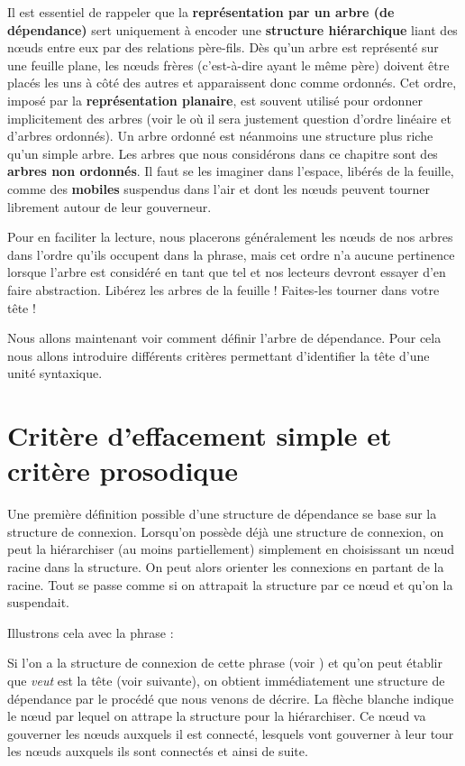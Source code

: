 Il est essentiel de rappeler que la \textbf{représentation par un arbre (de} \textbf{dépendance)} sert uniquement à encoder une \textbf{structure hiérarchique} liant des nœuds entre eux par des relations père-fils. Dès qu’un arbre est représenté sur une feuille plane, les nœuds frères (c’est-à-dire ayant le même père) doivent être placés les uns à côté des autres et apparaissent donc comme ordonnés. Cet ordre, imposé par la \textbf{représentation planaire}, est souvent utilisé pour ordonner implicitement des arbres (voir le  où il sera justement question d’ordre linéaire et d’arbres ordonnés). Un arbre ordonné est néanmoins une structure plus riche qu’un simple arbre. Les arbres que nous considérons dans ce chapitre sont des \textbf{arbres non ordonnés}. Il faut se les imaginer dans l’espace, libérés de la feuille, comme des \textbf{mobiles} suspendus dans l’air et dont les nœuds peuvent tourner librement autour de leur gouverneur.

Pour en faciliter la lecture, nous placerons généralement les nœuds de nos arbres dans l’ordre qu’ils occupent dans la phrase, mais cet ordre n’a aucune pertinence lorsque l’arbre est considéré en tant que tel et nos lecteurs devront essayer d’en faire abstraction. Libérez les arbres de la feuille ! Faites-les tourner dans votre tête !

Nous allons maintenant voir comment définir l’arbre de dépendance. Pour cela nous allons introduire différents critères permettant d’identifier la tête d’une unité syntaxique.

\section{Critère d’effacement simple et critère prosodique}\label{sec:3.3.7}

Une première définition possible d’une structure de dépendance se base sur la structure de connexion. Lorsqu’on possède déjà une structure de connexion, on peut la hiérarchiser (au moins partiellement) simplement en choisissant un nœud racine dans la structure. On peut alors orienter les connexions en partant de la racine. Tout se passe comme si on attrapait la structure par ce nœud et qu’on la suspendait.

Illustrons cela avec la phrase :

\z

Si l’on a la structure de connexion de cette phrase (voir ) et qu’on peut établir que \textit{veut} est la tête (voir  suivante), on obtient immédiatement une structure de dépendance par le procédé que nous venons de décrire. La flèche blanche indique le nœud par lequel on attrape la structure pour la hiérarchiser. Ce nœud va gouverner les nœuds auxquels il est connecté, lesquels vont gouverner à leur tour les nœuds auxquels ils sont connectés et ainsi de suite.

